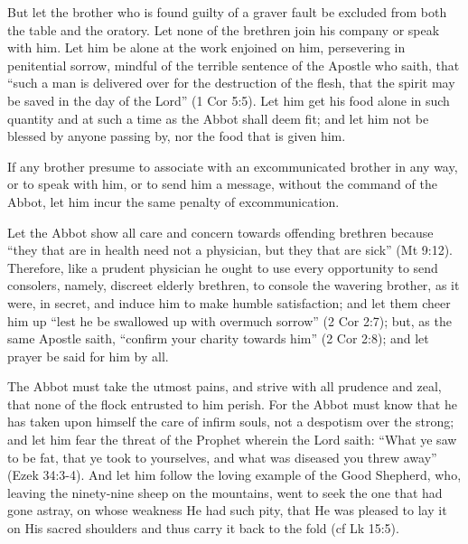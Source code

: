 
But let the brother who is found guilty of a graver fault be excluded from both the table and the oratory. Let none of the brethren join his company or speak with him. Let him be alone at the work enjoined on him, persevering in penitential sorrow, mindful of the terrible sentence of the Apostle who saith, that ``such a man is delivered over for the destruction of the flesh, that the spirit may be saved in the day of the Lord'' (1 Cor 5:5). Let him get his food alone in such quantity and at such a time as the Abbot shall deem fit; and let him not be blessed by anyone passing by, nor the food that is given him.


If any brother presume to associate with an excommunicated brother in any way, or to speak with him, or to send him a message, without the command of the Abbot, let him incur the same penalty of excommunication.


Let the Abbot show all care and concern towards offending brethren because ``they that are in health need not a physician, but they that are sick'' (Mt 9:12). Therefore, like a prudent physician he ought to use every opportunity to send consolers, namely, discreet elderly brethren, to console the wavering brother, as it were, in secret, and induce him to make humble satisfaction; and let them cheer him up ``lest he be swallowed up with overmuch sorrow'' (2 Cor 2:7); but, as the same Apostle saith, ``confirm your charity towards him'' (2 Cor 2:8); and let prayer be said for him by all.

The Abbot must take the utmost pains, and strive with all prudence and zeal, that none of the flock entrusted to him perish. For the Abbot must know that he has taken upon himself the care of infirm souls, not a despotism over the strong; and let him fear the threat of the Prophet wherein the Lord saith: ``What ye saw to be fat, that ye took to yourselves, and what was diseased you threw away'' (Ezek 34:3-4). And let him follow the loving example of the Good Shepherd, who, leaving the ninety-nine sheep on the mountains, went to seek the one that had gone astray, on whose weakness He had such pity, that He was pleased to lay it on His sacred shoulders and thus carry it back to the fold (cf Lk 15:5).


